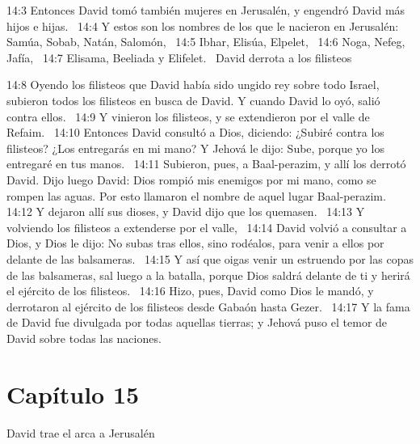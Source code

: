 14:3 Entonces David tomó también mujeres en Jerusalén, y engendró David más hijos e hijas.  
14:4 Y estos son los nombres de los que le nacieron en Jerusalén: Samúa, Sobab, Natán, Salomón,  
14:5 Ibhar, Elisúa, Elpelet,  
14:6 Noga, Nefeg, Jafía,  
14:7 Elisama, Beeliada y Elifelet.  
David derrota a los filisteos  

14:8 Oyendo los filisteos que David había sido ungido rey sobre todo Israel, subieron todos los filisteos en busca de David. Y cuando David lo oyó, salió contra ellos.  
14:9 Y vinieron los filisteos, y se extendieron por el valle de Refaim.  
14:10 Entonces David consultó a Dios, diciendo: ¿Subiré contra los filisteos? ¿Los entregarás en mi mano? Y Jehová le dijo: Sube, porque yo los entregaré en tus manos.  
14:11 Subieron, pues, a Baal-perazim, y allí los derrotó David. Dijo luego David: Dios rompió mis enemigos por mi mano, como se rompen las aguas. Por esto llamaron el nombre de aquel lugar Baal-perazim.  
14:12 Y dejaron allí sus dioses, y David dijo que los quemasen.  
14:13 Y volviendo los filisteos a extenderse por el valle,  
14:14 David volvió a consultar a Dios, y Dios le dijo: No subas tras ellos, sino rodéalos, para venir a ellos por delante de las balsameras.  
14:15 Y así que oigas venir un estruendo por las copas de las balsameras, sal luego a la batalla, porque Dios saldrá delante de ti y herirá el ejército de los filisteos.  
14:16 Hizo, pues, David como Dios le mandó, y derrotaron al ejército de los filisteos desde Gabaón hasta Gezer.  
14:17 Y la fama de David fue divulgada por todas aquellas tierras; y Jehová puso el temor de David sobre todas las naciones. 

\section*{Capítulo 15}
David trae el arca a Jerusalén  


